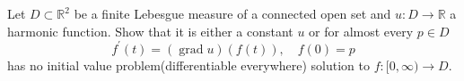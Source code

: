 Let $ D \subset \mathbb {R} ^ {2} $ be a finite Lebesgue measure of a connected open set and $ u: D \rightarrow \mathbb {R} $ a harmonic function. Show that it is either a constant $ u $ or for almost every $ p \in D $
$$
f ^ {\prime} (t) = (\operatorname {grad} u) (f (t)), \quad f (0) = p
$$has no initial value problem(differentiable everywhere) solution to $ f:[0,\infty) \rightarrow D $.